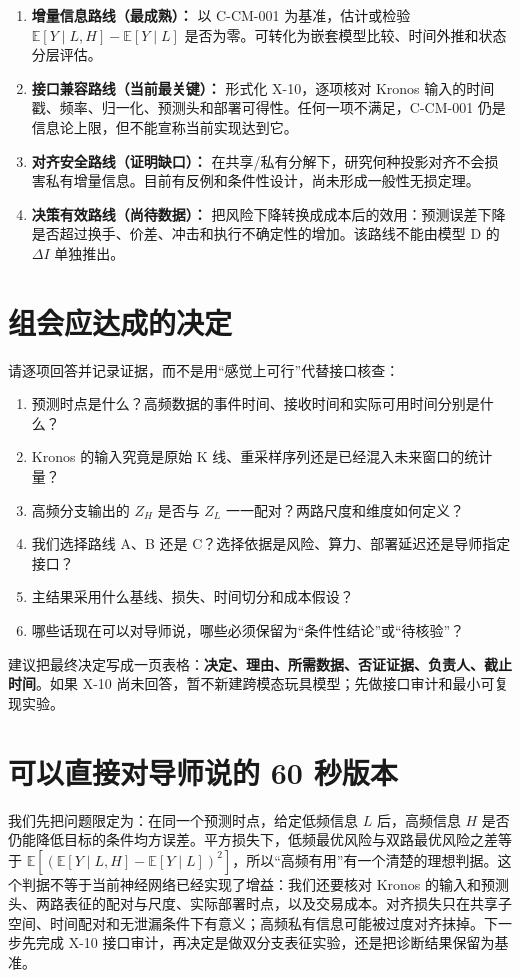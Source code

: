 \documentclass[UTF8,11pt,a4paper]{ctexart}
\newcommand{\E}{\mathbb E}
\begin{document}
\begin{enumerate}
  \item \textbf{增量信息路线（最成熟）：} 以 C-CM-001 为基准，估计或检验 $\E[Y\mid L,H]-\E[Y\mid L]$ 是否为零。可转化为嵌套模型比较、时间外推和状态分层评估。
  \item \textbf{接口兼容路线（当前最关键）：} 形式化 X-10，逐项核对 Kronos 输入的时间戳、频率、归一化、预测头和部署可得性。任何一项不满足，C-CM-001 仍是信息论上限，但不能宣称当前实现达到它。
  \item \textbf{对齐安全路线（证明缺口）：} 在共享/私有分解下，研究何种投影对齐不会损害私有增量信息。目前有反例和条件性设计，尚未形成一般性无损定理。
  \item \textbf{决策有效路线（尚待数据）：} 把风险下降转换成成本后的效用：预测误差下降是否超过换手、价差、冲击和执行不确定性的增加。该路线不能由模型 D 的 $\Delta I$ 单独推出。
\end{enumerate}

\section{组会应达成的决定}

请逐项回答并记录证据，而不是用“感觉上可行”代替接口核查：
\begin{enumerate}
  \item 预测时点是什么？高频数据的事件时间、接收时间和实际可用时间分别是什么？
  \item Kronos 的输入究竟是原始 K 线、重采样序列还是已经混入未来窗口的统计量？
  \item 高频分支输出的 $Z_H$ 是否与 $Z_L$ 一一配对？两路尺度和维度如何定义？
  \item 我们选择路线 A、B 还是 C？选择依据是风险、算力、部署延迟还是导师指定接口？
  \item 主结果采用什么基线、损失、时间切分和成本假设？
  \item 哪些话现在可以对导师说，哪些必须保留为“条件性结论”或“待核验”？
\end{enumerate}

建议把最终决定写成一页表格：\textbf{决定、理由、所需数据、否证证据、负责人、截止时间}。如果 X-10 尚未回答，暂不新建跨模态玩具模型；先做接口审计和最小可复现实验。

\section{可以直接对导师说的 60 秒版本}

我们先把问题限定为：在同一个预测时点，给定低频信息 $L$ 后，高频信息 $H$ 是否仍能降低目标的条件均方误差。平方损失下，低频最优风险与双路最优风险之差等于 $\E[(\E[Y\mid L,H]-\E[Y\mid L])^2]$，所以“高频有用”有一个清楚的理想判据。这个判据不等于当前神经网络已经实现了增益：我们还要核对 Kronos 的输入和预测头、两路表征的配对与尺度、实际部署时点，以及交易成本。对齐损失只在共享子空间、时间配对和无泄漏条件下有意义；高频私有信息可能被过度对齐抹掉。下一步先完成 X-10 接口审计，再决定是做双分支表征实验，还是把诊断结果保留为基准。
\end{document}
